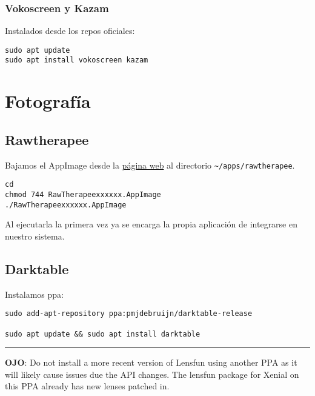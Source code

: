 \documentclass[
  12pt,
  spanish,
]{article}
\begin{document}
\hypertarget{vokoscreen-y-kazam}{%
\subsubsection{Vokoscreen y Kazam}\label{vokoscreen-y-kazam}}

Instalados desde los repos oficiales:

\begin{verbatim}
sudo apt update
sudo apt install vokoscreen kazam
\end{verbatim}

\hypertarget{fotografuxeda}{%
\section{Fotografía}\label{fotografuxeda}}

\hypertarget{rawtherapee}{%
\subsection{Rawtherapee}\label{rawtherapee}}

Bajamos el AppImage desde la \href{http://rawtherapee.com/}{página web}
al directorio \texttt{\textasciitilde{}/apps/rawtherapee}.

\begin{verbatim}
cd
chmod 744 RawTherapeexxxxxx.AppImage
./RawTherapeexxxxxx.AppImage
\end{verbatim}

Al ejecutarla la primera vez ya se encarga la propia aplicación de
integrarse en nuestro sistema.

\hypertarget{darktable}{%
\subsection{Darktable}\label{darktable}}

Instalamos ppa:

\begin{verbatim}
sudo add-apt-repository ppa:pmjdebruijn/darktable-release

sudo apt update && sudo apt install darktable
\end{verbatim}

\begin{center}\rule{0.5\linewidth}{\linethickness}\end{center}

\textbf{OJO}: Do not install a more recent version of Lensfun using
another PPA as it will likely cause issues due the API changes. The
lensfun package for Xenial on this PPA already has new lenses patched
in.
\end{document}

